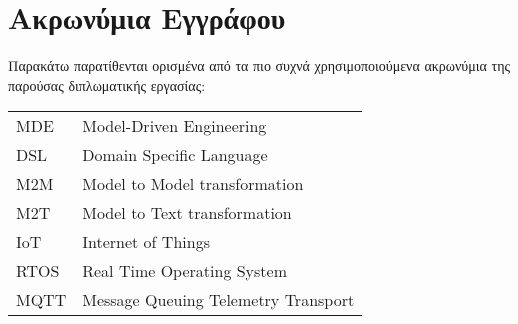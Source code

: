 \chapter*{Ακρωνύμια Εγγράφου}
\label{append:acronyms}
{}

Παρακάτω παρατίθενται ορισμένα από τα πιο συχνά χρησιμοποιούμενα ακρωνύμια της
παρούσας διπλωματικής εργασίας:

\begin{table}[htpb]
  \centering
  \begin{tabular}{l@{$\;\;\longrightarrow\;\;$}l}
  	MDE & Model-Driven Engineering\\
    DSL & Domain Specific Language\\
    M2M & Model to Model transformation\\
    M2T & Model to Text transformation\\ 
    IoT & Internet of Things\\
    RTOS & Real Time Operating System\\
    MQTT & Message Queuing Telemetry Transport\\
   \end{tabular}
\end{table}
